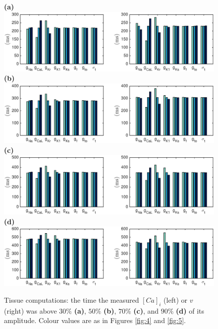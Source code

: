 \documentclass[12pt,a4paper]{article}
\begin{document}
\begin{figure}
 \textbf{(a)}  \includegraphics[trim=1cm 0cm 2cm 0cm, clip=true, width=1\linewidth]{30p} 
 \textbf{(b)}  \includegraphics[trim=1cm 0cm 2cm 0cm, clip=true, width=1\linewidth]{50p} 
 \textbf{(c)}   \includegraphics[trim=1cm 0cm 2cm 0cm, clip=true, width=1\linewidth]{70p} 
  \textbf{(d)}   \includegraphics[trim=1cm 0cm 2cm 0cm, clip=true, width=1\linewidth]{90p} 
    \caption{Tissue computations: the time the measured $[Ca]_i$ (left) or $v$ (right) was above $30\%$ \textbf{(a)}, $50\%$ \textbf{(b)}, $70\%$ \textbf{(c)}, and $90\%$ \textbf{(d)} of its amplitude. Colour values are as in Figures \ref{fig:4} and \ref{fig:5}.}
    \label{fig:7}
\end{figure}
%
\end{document}
